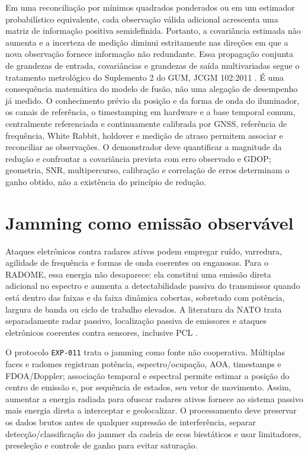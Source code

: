 Em uma reconciliação por mínimos quadrados ponderados ou em um estimador probabilístico equivalente, cada observação válida adicional acrescenta uma matriz de informação positiva semidefinida. Portanto, a covariância estimada não aumenta e a incerteza de medição diminui estritamente nas direções em que a nova observação fornece informação não redundante. Essa propagação conjunta de grandezas de entrada, covariâncias e grandezas de saída multivariadas segue o tratamento metrológico do Suplemento 2 do GUM, JCGM 102:2011 \cite{jcgm1022011}. É uma consequência matemática do modelo de fusão, não uma alegação de desempenho já medido. O conhecimento prévio da posição e da forma de onda do iluminador, os canais de referência, o timestamping em hardware e a base temporal comum, centralmente referenciada e continuamente calibrada por GNSS, referência de frequência, White Rabbit, holdover e medição de atraso permitem associar e reconciliar as observações. O demonstrador deve quantificar a magnitude da redução e confrontar a covariância prevista com erro observado e GDOP; geometria, SNR, multipercurso, calibração e correlação de erros determinam o ganho obtido, não a existência do princípio de redução.

\section{Jamming como emissão observável}
Ataques eletrônicos contra radares ativos podem empregar ruído, varredura, agilidade de frequência e formas de onda coerentes ou enganosas. Para o RADOME, essa energia não desaparece: ela constitui uma emissão direta adicional no espectro e aumenta a detectabilidade passiva do transmissor quando está dentro das faixas e da faixa dinâmica cobertas, sobretudo com potência, largura de banda ou ciclo de trabalho elevados. A literatura da NATO trata separadamente radar passivo, localização passiva de emissores e ataques eletrônicos coerentes contra sensores, inclusive PCL \cite{nato2019passiveradar,nato2017coherentea}.

O protocolo \texttt{EXP-011} trata o jamming como fonte não cooperativa. Múltiplas faces e radomes registram potência, espectro/ocupação, AOA, timestamps e FDOA/Doppler; associação temporal e espectral permite estimar a posição do centro de emissão e, por sequência de estados, seu vetor de movimento. Assim, aumentar a energia radiada para ofuscar radares ativos fornece ao sistema passivo mais energia direta a interceptar e geolocalizar. O processamento deve preservar os dados brutos antes de qualquer supressão de interferência, separar detecção/classificação do jammer da cadeia de ecos biestáticos e usar limitadores, preseleção e controle de ganho para evitar saturação.

